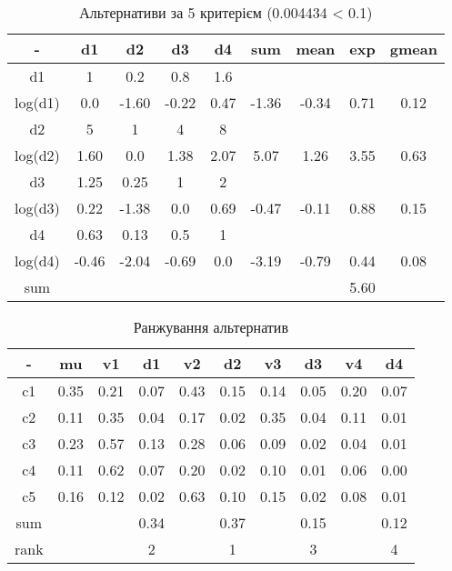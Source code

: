 \begin{table}[!ht]
    \centering
    \caption{Альтернативи за 5 критерієм (0.004434 < 0.1)}
    \label{tab:alternative_priorities5}

    \begin{tabular}{|c||c|c|c|c||c|c|c||c|}
        \toprule
        -       & d1    & d2    & d3    & d4   & sum   & mean  & exp  & gmean \\

        \midrule
        d1      & 1     & 0.2   & 0.8   & 1.6  &       &       &      &       \\
        log(d1) & 0.0   & -1.60 & -0.22 & 0.47 & -1.36 & -0.34 & 0.71 & 0.12  \\
        \hline
        d2      & 5     & 1     & 4     & 8    &       &       &      &       \\
        log(d2) & 1.60  & 0.0   & 1.38  & 2.07 & 5.07  & 1.26  & 3.55 & 0.63  \\
        \hline
        d3      & 1.25  & 0.25  & 1     & 2    &       &       &      &       \\
        log(d3) & 0.22  & -1.38 & 0.0   & 0.69 & -0.47 & -0.11 & 0.88 & 0.15  \\
        \hline
        d4      & 0.63  & 0.13  & 0.5   & 1    &       &       &      &       \\
        log(d4) & -0.46 & -2.04 & -0.69 & 0.0  & -3.19 & -0.79 & 0.44 & 0.08  \\

        \bottomrule
        sum     &       &       &       &      &       &       & 5.60 &       \\
        \hline
    \end{tabular}
\end{table}

\begin{table}[!ht]
    \centering
    \caption{Ранжування альтернатив}
    \label{tab:ranking}

    \begin{tabular}{|c||c||cc|cc|cc|cc|}
        \toprule
        -    & mu   & v1   & d1   & v2   & d2   & v3   & d3   & v4   & d4   \\

        \midrule
        c1   & 0.35 & 0.21 & 0.07 & 0.43 & 0.15 & 0.14 & 0.05 & 0.20 & 0.07 \\
        c2   & 0.11 & 0.35 & 0.04 & 0.17 & 0.02 & 0.35 & 0.04 & 0.11 & 0.01 \\
        c3   & 0.23 & 0.57 & 0.13 & 0.28 & 0.06 & 0.09 & 0.02 & 0.04 & 0.01 \\
        c4   & 0.11 & 0.62 & 0.07 & 0.20 & 0.02 & 0.10 & 0.01 & 0.06 & 0.00 \\
        c5   & 0.16 & 0.12 & 0.02 & 0.63 & 0.10 & 0.15 & 0.02 & 0.08 & 0.01 \\

        \bottomrule
        sum  &      &      & 0.34 &      & 0.37 &      & 0.15 &      & 0.12 \\
        \hline
        rank &      &      & 2    &      & 1    &      & 3    &      & 4    \\
        \hline
    \end{tabular}
\end{table}
